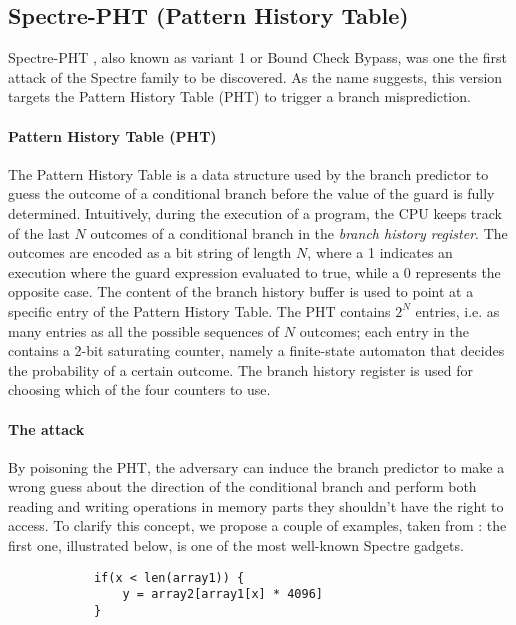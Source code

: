 \documentclass[target=mst,aauheader=aics]{thud}
\theoremstyle{definition}
\begin{document}
	\subsection{Spectre-PHT (Pattern History Table)}\label{sec:spectre-pht}
	Spectre-PHT \cite{Kocher2019}\cite{Canella2019}\cite{Evtyushkin2018}, also known as variant 1 or Bound Check Bypass, was one the first attack of the Spectre family to be discovered. As the name suggests, this version targets the Pattern History Table (PHT) to trigger a branch misprediction.
	\paragraph{Pattern History Table (PHT)} The Pattern History Table \cite{Fog2021} is a data structure used by the branch predictor to guess the outcome of a conditional branch before the value of the guard is fully determined. Intuitively, during the execution of a program, the CPU keeps track of the last $N$ outcomes of a conditional branch in the \textit{branch history register}. The outcomes are encoded as a bit string of length $N$, where a 1 indicates an execution where the guard expression evaluated to true, while a 0 represents the opposite case. The content of the branch history buffer is used to point at a specific entry of the Pattern History Table. The PHT contains $2^N$ entries, i.e. as many entries as all the possible sequences of $N$ outcomes; each entry in
	the contains a 2-bit saturating counter, namely a finite-state automaton that decides the probability of a certain outcome. The branch history register is used for choosing which of the four counters to use.
	
	\paragraph{The attack} By poisoning the PHT, the adversary can induce the branch predictor to make a wrong guess about the direction of the conditional branch and perform both reading and writing operations in memory parts they shouldn't have the right to access. To clarify this concept, we propose a couple of examples, taken from \cite{Canella2019}: the first one, illustrated below, is one of the most well-known Spectre gadgets.
	
	\vspace{3mm}
	\begin{minipage}{.5\textwidth}
		\begin{lstlisting}
			if(x < len(array1)) {
				y = array2[array1[x] * 4096]
			}
		\end{lstlisting}
	\end{minipage}
	
\end{document}
